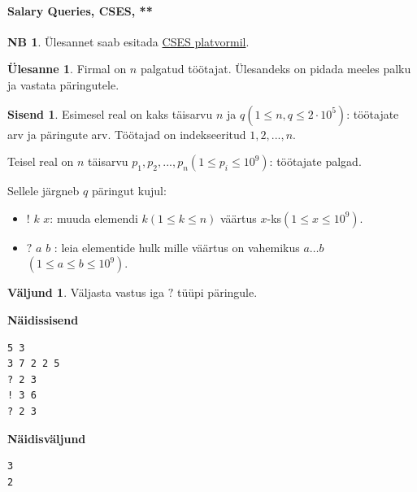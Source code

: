 \documentclass{trkut}
\theoremstyle{definition}
\newtheorem*{extra}{NB}
\newtheorem*{Input}{Sisend}
\newtheorem*{Output}{Väljund}
\newtheorem*{Text}{Ülesanne}
\begin{document}
\paragraph{Salary Queries, CSES, **}
\begin{extra}
Ülesannet saab esitada \href{https://cses.fi/problemset/task/1144}{CSES platvormil}.
\end{extra}
\begin{Text}
Firmal on $n$ palgatud töötajat. Ülesandeks on pidada meeles palku ja vastata päringutele.

\parencite{salary}
\end{Text}
\begin{Input}
Esimesel real on kaks täisarvu $n$ ja $q$$(1\le n, q\le 2\cdot 10^5)$: töötajate arv ja päringute arv.
Töötajad on indekseeritud $1,2,...,n$.

Teisel real on $n$ täisarvu $p_1,p_2,...,p_n$$(1\le p_i\le 10^9)$: töötajate palgad.

   Sellele järgneb $q$ päringut kujul:
\begin{itemize}
\item $!$ $k$ $x$: muuda elemendi $k$$(1\le k\le n)$ väärtus $x$-ks$(1\le x\le 10^9)$.
\item $?$ $a$ $b$ : leia elementide hulk mille väärtus on vahemikus $a…b$$(1\le a\le b\le 10^9)$.
\end{itemize}
\end{Input}
\begin{Output}
Väljasta vastus iga $?$ tüüpi päringule.
\end{Output}

\textbf{Näidissisend}

\begin{verbatim}
5 3
3 7 2 2 5
? 2 3
! 3 6
? 2 3
\end{verbatim}

\textbf{Näidisväljund}

\begin{verbatim}
3
2
\end{verbatim}
\end{document}
